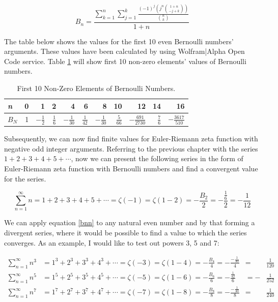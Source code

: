 \documentclass[a4paper]{article}
\begin{document}
\begin{equation*}
  B_n=\frac{\sum_{k=1}^{n} \sum_{j=1}^{k} \frac{(-1)^j (j^n \binom{1+n}{-j+k}) }{\binom{n}{k}} }{1+n}
  \end{equation*}

The table below shows the values for the first 10 even Bernoulli numbers'
arguments. These values have been calculated by using Wolfram|Alpha Open Code
service. Table \ref{tab:org0d68c65} will show first 10 non-zero elements' values
of Bernoulli numbers. 

\begin{table}[htbp]
\caption{\label{tab:org0d68c65}
First 10 Non-Zero Elements of Bernoulli Numbers.}
\centering
\begin{tabular}{lrrrrrrrrrr}
\emph{n} & 0 & 1 & 2 & 4 & 6 & 8 & 10 & 12 & 14 & 16\\
\hline
\(B_N\) & 1 & \(-\frac{1}{2}\) & \(\frac{1}{6}\) & \(-\frac{1}{30}\) & \(\frac{1}{42}\) & \(-\frac{1}{30}\) & \(\frac{5}{66}\) & \(-\frac{691}{2730}\) & \(\frac{7}{6}\) & \(-\frac{3617}{510}\)\\
\end{tabular}
\end{table}


Subsequently, we can now find finite values for Euler-Riemann zeta function with
negative odd integer arguments. Referring to the previous chapter with the
series \(1+2+3+4+5+\cdots\), now we can present the following series in the form of
Euler-Riemann zeta function with Bernoulli numbers and find a convergent value
for the series. 

\begin{equation}
  \sum_{n=1}^{\infty} n = 1+2+3+4+5+\cdots=\zeta(-1)=\zeta(1-2)=-\frac{B_2}{2}=
  -\frac{\frac{1}{6}}{2}=-\frac{1}{12}
  \end{equation}

We can apply equation \ref{bnn} to any natural even number and by that forming a
divergent series, where it would be possible to find a value to which the series
converges. As an example, I would like to test out powers 3, 5 and 7: 

\begin{align*}
  \sum_{n=1}^{\infty}n^3&=1^3+2^3+3^3+4^3+\cdots=\zeta(-3)=\zeta(1-4)=
  -\frac{B_4}{4}=-\frac{-\frac{1}{30}}{4}&=&\frac{1}{120}\\
  \sum_{n=1}^{\infty}n^5&=1^5+2^5+3^5+4^5+\cdots=\zeta(-5)=\zeta(1-6)=
  -\frac{B_6}{6}=-\frac{\frac{1}{42}}{6}&=-&\frac{1}{252}\\
  \sum_{n=1}^{\infty}n^7&=1^7+2^7+3^7+4^7+\cdots=\zeta(-7)=\zeta(1-8)=
  -\frac{B_8}{8}=-\frac{-\frac{1}{30}}{8}&=&\frac{1}{240}
\end{align*}
\end{document}
